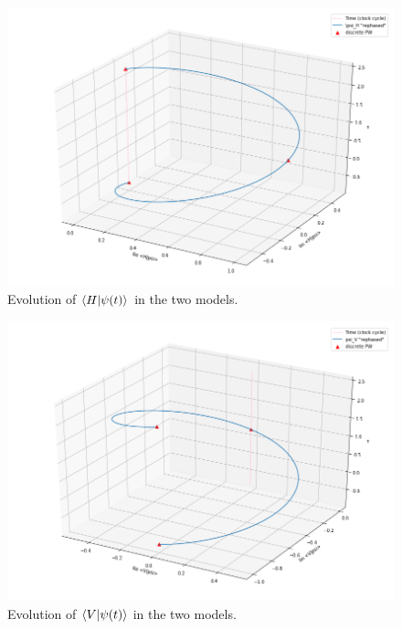 \begin{figure}
  \includegraphics[width=\textwidth]{img/psi_H.png}
  \caption{
    Evolution of $\braket{H}{\psi(t)}$ in the two models.
  }
  \label{fig:psi_H}
\end{figure}

\begin{figure}
  \includegraphics[width=\textwidth]{img/psi_V.png}
  \caption{Evolution of $\braket{V}{\psi(t)}$ in the two models.}
  \label{fig:psi_V}
\end{figure}
